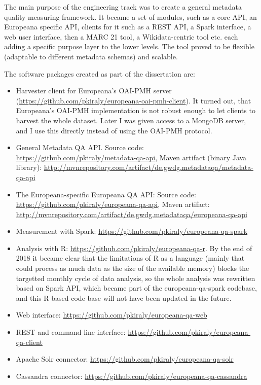 The main purpose of the engineering track was to create a general metadata quality measuring framework. It became a set of modules, such as a core API, an Europeana specific API, clients for it such as a REST API, a Spark interface, a web user interface, then a MARC 21 tool, a Wikidata-centric tool etc. each adding a specific purpose layer to the lower levels. The tool proved to be flexible (adaptable to different metadata schemas) and scalable.

The software packages created as part of the dissertation are:

\begin{itemize}
  \setlength{\parskip}{0pt}
  \setlength{\itemsep}{0pt plus 1pt}
\item Harvester client for Europeana's OAI-PMH server (\url{https://github.com/pkiraly/europeana-oai-pmh-client}). It turned out, that Europeana's OAI-PMH implementation is not robust enough to let clients to harvest the whole dataset. Later I was given access to a MongoDB server, and I use this directly instead of using the OAI-PMH protocol.
\item General Metadata QA API. Source code: \url{https://github.com/pkiraly/metadata-qa-api},
Maven artifact (binary Java library): \url{http://mvnrepository.com/artifact/de.gwdg.metadataqa/metadata-qa-api}
\item The Europeana-specific Europeana QA API:
Source code: \url{https://github.com/pkiraly/europeana-qa-api},
Maven artifact: \url{http://mvnrepository.com/artifact/de.gwdg.metadataqa/europeana-qa-api}
\item Measurement with Spark: \url{https://github.com/pkiraly/europeana-qa-spark}
\item Analysis with R: \url{https://github.com/pkiraly/europeana-qa-r}. By the end of 2018 it became clear that the limitations of R as a language (mainly that could process as much data as the size of the available memory) blocks the targetted monthly cycle of data analysis, so the whole analysis was rewritten based on Spark API, which became part of the europeana-qa-spark codebase, and this R based code base will not have been updated in the future.
\item Web interface: \url{https://github.com/pkiraly/europeana-qa-web}
\item REST and command line interface: \url{https://github.com/pkiraly/europeana-qa-client}
\item Apache Solr connector: \url{https://github.com/pkiraly/europeana-qa-solr}
\item Cassandra connector: \url{https://github.com/pkiraly/europeana-qa-cassandra}

\end{itemize}
